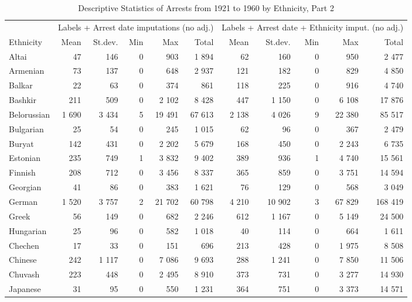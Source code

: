 \begin{table}[!h]

\caption{\label{tab:descr_stats_date_imp}Descriptive Statistics of Arrests from 1921 to 1960 by Ethnicity, Part 2}
\centering
\fontsize{8}{10}\selectfont
\begin{tabular}{lrrrrrrrrrr}
\toprule
\multicolumn{1}{c}{ } & \multicolumn{5}{c}{Labels + Arrest date imputations (no adj.)} & \multicolumn{5}{c}{Labels + Arrest date + Ethnicity imput. (no adj.)} \\
\cmidrule(l{2pt}r{2pt}){2-6} \cmidrule(l{2pt}r{2pt}){7-11}
Ethnicity & Mean & St.dev. & Min & Max & Total & Mean & St.dev. & Min & Max & Total\\
\midrule
Altai & 47 & 146 & 0 & 903 & 1 894 & 62 & 160 & 0 & 950 & 2 477\\
Armenian & 73 & 137 & 0 & 648 & 2 937 & 121 & 182 & 0 & 829 & 4 850\\
Balkar & 22 & 63 & 0 & 374 & 861 & 118 & 225 & 0 & 916 & 4 740\\
Bashkir & 211 & 509 & 0 & 2 102 & 8 428 & 447 & 1 150 & 0 & 6 108 & 17 876\\
Belorussian & 1 690 & 3 434 & 5 & 19 491 & 67 613 & 2 138 & 4 026 & 9 & 22 380 & 85 517\\
Bulgarian & 25 & 54 & 0 & 245 & 1 015 & 62 & 96 & 0 & 367 & 2 479\\
Buryat & 142 & 431 & 0 & 2 202 & 5 679 & 168 & 450 & 0 & 2 243 & 6 735\\
Estonian & 235 & 749 & 1 & 3 832 & 9 402 & 389 & 936 & 1 & 4 740 & 15 561\\
Finnish & 208 & 712 & 0 & 3 456 & 8 337 & 365 & 859 & 0 & 3 751 & 14 594\\
Georgian & 41 & 86 & 0 & 383 & 1 621 & 76 & 129 & 0 & 568 & 3 049\\
German & 1 520 & 3 757 & 2 & 21 702 & 60 798 & 4 210 & 10 902 & 3 & 67 829 & 168 419\\
Greek & 56 & 149 & 0 & 682 & 2 246 & 612 & 1 167 & 0 & 5 149 & 24 500\\
Hungarian & 25 & 96 & 0 & 582 & 1 018 & 40 & 114 & 0 & 664 & 1 611\\
Chechen & 17 & 33 & 0 & 151 & 696 & 213 & 428 & 0 & 1 975 & 8 508\\
Chinese & 242 & 1 117 & 0 & 7 086 & 9 693 & 288 & 1 241 & 0 & 7 850 & 11 506\\
Chuvash & 223 & 448 & 0 & 2 495 & 8 910 & 373 & 731 & 0 & 3 277 & 14 930\\
Japanese & 31 & 95 & 0 & 550 & 1 231 & 364 & 751 & 0 & 3 373 & 14 571\\

\end{tabular}
\end{table}
